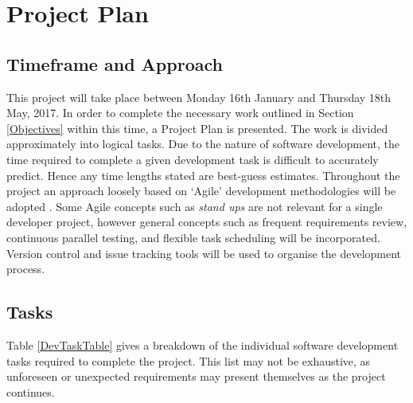 \documentclass[titlepage,hidelinks,10pt]{article}
\begin{document}
\section{Project Plan}
\subsection{Timeframe and Approach}
This project will take place between Monday 16th January and Thursday 18th May, 2017. In order to complete the necessary work outlined in Section \ref{Objectives} within this time, a Project Plan is presented. The work is divided approximately into logical tasks.  Due to the nature of software development, the time required to complete a given development task is difficult to accurately predict. Hence any time lengths stated are best-guess estimates. Throughout the project an approach loosely based on `Agile' development methodologies will be adopted \cite{Agile}. Some Agile concepts such as \textit{stand ups} are not relevant for a single developer project, however general concepts such as frequent requirements review, continuous parallel testing, and flexible task scheduling will be incorporated. Version control and issue tracking tools will be used to organise the development process.

\subsection{Tasks}\label{Tasks}
Table \ref{DevTaskTable} gives a breakdown of the individual software development tasks required to complete the project. This list may not be exhaustive, as unforeseen or unexpected requirements may present themselves as the project continues.
\end{document}
